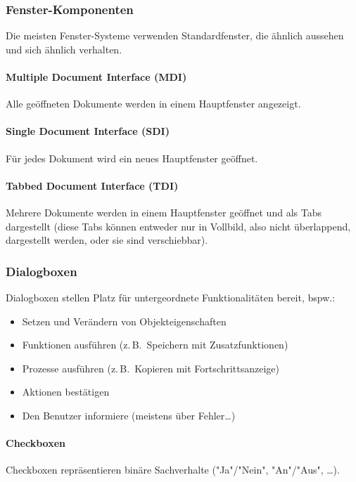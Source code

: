 \documentclass[a4paper, 11pt, accentcolor = tud3b]{tudreport}
\newcommand{\zB}{z.\,B.~}
\begin{document}
				\subsubsection{Fenster-Komponenten}
					Die meisten Fenster-Systeme verwenden Standardfenster, die ähnlich aussehen und sich ähnlich verhalten.

					\paragraph{Multiple Document Interface (MDI)}
						Alle geöffneten Dokumente werden in einem Hauptfenster angezeigt.

					\paragraph{Single Document Interface (SDI)}
						Für jedes Dokument wird ein neues Hauptfenster geöffnet.

					\paragraph{Tabbed Document Interface (TDI)}
						Mehrere Dokumente werden in einem Hauptfenster geöffnet und als Tabs dargestellt (diese Tabs können entweder nur in Vollbild, also nicht überlappend, dargestellt werden, oder sie sind verschiebbar).

				\subsubsection{Dialogboxen}
					Dialogboxen stellen Platz für untergeordnete Funktionalitäten bereit, bspw.:
					\begin{itemize}
						\item Setzen und Verändern von Objekteigenschaften
						\item Funktionen ausführen (\zB Speichern mit Zusatzfunktionen)
						\item Prozesse ausführen (\zB Kopieren mit Fortschrittsanzeige)
						\item Aktionen bestätigen
						\item Den Benutzer informiere (meistens über Fehler\dots)
					\end{itemize}

					\paragraph{Checkboxen}
						Checkboxen repräsentieren binäre Sachverhalte ("Ja"/"Nein", "An"/"Aus", \dots).
\end{document}
